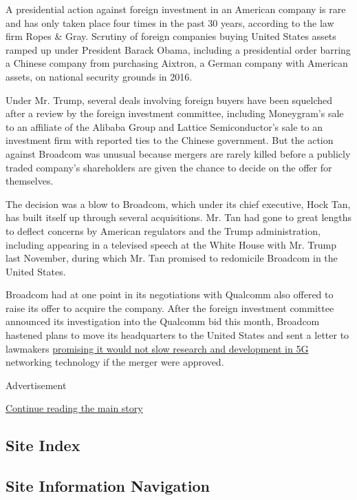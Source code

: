 A presidential action against foreign investment in an American company
is rare and has only taken place four times in the past 30 years,
according to the law firm Ropes \& Gray. Scrutiny of foreign companies
buying United States assets ramped up under President Barack Obama,
including a presidential order barring a Chinese company from purchasing
Aixtron, a German company with American assets, on national security
grounds in 2016.

Under Mr. Trump, several deals involving foreign buyers have been
squelched after a review by the foreign investment committee, including
Moneygram's sale to an affiliate of the Alibaba Group and Lattice
Semiconductor's sale to an investment firm with reported ties to the
Chinese government. But the action against Broadcom was unusual because
mergers are rarely killed before a publicly traded company's
shareholders are given the chance to decide on the offer for themselves.

The decision was a blow to Broadcom, which under its chief executive,
Hock Tan, has built itself up through several acquisitions. Mr. Tan had
gone to great lengths to deflect concerns by American regulators and the
Trump administration, including appearing in a televised speech at the
White House with Mr. Trump last November, during which Mr. Tan promised
to redomicile Broadcom in the United States.

Broadcom had at one point in its negotiations with Qualcomm also offered
to raise its offer to acquire the company. After the foreign investment
committee announced its investigation into the Qualcomm bid this month,
Broadcom hastened plans to move its headquarters to the United States
and sent a letter to lawmakers
\href{https://www.nytimes.com/2018/03/07/business/dealbook/broadcom-qualcomm-5g-cfius.html}{promising
it would not slow research and development in 5G} networking technology
if the merger were approved.

Advertisement

\protect\hyperlink{after-bottom}{Continue reading the main story}

\hypertarget{site-index}{%
\subsection{Site Index}\label{site-index}}

\hypertarget{site-information-navigation}{%
\subsection{Site Information
Navigation}\label{site-information-navigation}}

